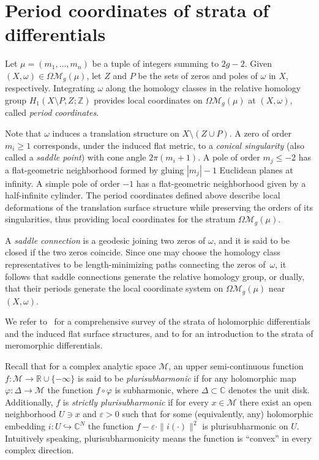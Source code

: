 \documentclass[11]{amsart}
\theoremstyle{plain}
\theoremstyle{definition}
\begin{document}
\section{Period coordinates of strata of differentials}

Let $\mu = (m_1, \ldots, m_n)$ be a tuple of integers summing to $2g - 2$. Given $(X, \omega) \in \Omega\mathcal M_g(\mu)$, let $Z$ and $P$ be the sets of zeros and poles of $\omega$ in $X$, respectively. Integrating $\omega$ along the homology classes in the relative homology group $H_1(X\setminus P, Z; \mathbb Z)$ provides local coordinates on $\Omega\mathcal M_g(\mu)$ at $(X,\omega)$, called {\em period coordinates}.   

Note that $\omega$ induces a translation structure on $X \setminus (Z \cup P)$. A zero of order $m_i \ge 1$ corresponds, under the induced flat metric, to a {\em conical singularity} (also called a {\em saddle point}) with cone angle $2\pi (m_i + 1)$. A pole of order $m_j \leq -2$ has a flat-geometric neighborhood formed by gluing $|m_j|-1$ Euclidean planes at infinity. A simple pole of order $-1$ has a flat-geometric neighborhood given by a half-infinite cylinder. The period coordinates defined above describe local deformations of the translation surface structure while preserving the orders of its singularities, thus providing local coordinates for the stratum $\Omega\mathcal M_g(\mu)$. 

A {\em saddle connection} is a geodesic joining two zeros of $\omega$, and it is said to be closed if the two zeros coincide. Since one may choose the homology class representatives to be length-minimizing paths connecting the zeros of~$\omega$, it follows that saddle connections generate the relative homology group, or dually, that their periods generate the local coordinate system on $\Omega\mathcal M_g(\mu)$ near $(X, \omega)$. 

We refer to~\cite{Zo06} for a comprehensive survey of the strata of holomorphic differentials and the induced flat surface structures, and to \cite{Bo15} for an introduction to the strata of meromorphic differentials.

Recall that for a complex analytic space $\mathcal M$, an upper semi-continuous function 
$f\colon \mathcal M\to \mathbb R \cup \{ -\infty \}$ is said to be {\em plurisubharmonic} if for any holomorphic map $\varphi\colon \Delta \to \mathcal M$ the function $f\circ \varphi$ is subharmonic, where $\Delta\subset \mathbb C$ denotes the unit disk. Additionally, $f$ is \emph{strictly plurisubharmonic}
if for every $x\in\mathcal M$ there exist an open neighborhood $U\ni x$ and $\varepsilon>0$
such that for some (equivalently, any) holomorphic embedding $i\colon U\hookrightarrow \mathbb C^N$ the function $f - \varepsilon\cdot \|i(\cdot)\|^2$
is plurisubharmonic on $U$. Intuitively speaking, plurisubharmonicity means the function is ``convex'' in every complex direction. 
\end{document}
